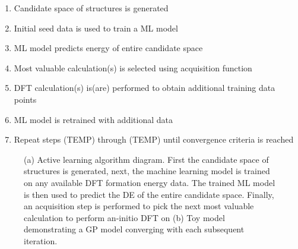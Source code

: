 \begin{enumerate}
  \item Candidate space of structures is generated
  \item Initial seed data is used to train a ML model
  \item ML model predicts energy of entire candidate space
  \item Most valuable calculation(s) is selected using acquisition function
  \item DFT calculation(s) is(are) performed to obtain additional training data points
  \item ML model is retrained with additional data
  \item Repeat steps (TEMP) through (TEMP) until convergence criteria is reached
\end{enumerate}




\begin{figure}
\centering
{}
\caption{\label{fig:all_diagram}
(a) Active learning algorithm diagram.
First the candidate space of structures is generated,
next, the machine learning model is trained on any available DFT formation energy data.
The trained ML model is then used to predict the DE of the entire candidate space.
Finally, an acquisition step is performed to pick the next most valuable calculation to perform an-initio DFT on
(b) Toy model demonstrating a GP model converging with each subsequent iteration.
}
\end{figure}



